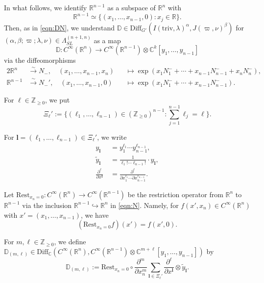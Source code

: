 \documentclass[reqno,11pt]{amsart}
\theoremstyle{remark}
\theoremstyle{definition}
\numberwithin{equation}{section}
\newcommand{\gb}{\beta}
\newcommand{\ga}{\alpha}
\newcommand{\gL}{\Lambda}
\newcommand{\R}{\mathbb{R}}
\newcommand{\C}{\mathbb{C}}
\newcommand{\Z}{\mathbb{Z}}
\newcommand{\To}{\longrightarrow}
\newcommand{\Diff}{\mathrm{Diff}}
\newcommand{\triv}{\mathrm{triv}}
\newcommand{\wy}{\widetilde{y}}
\newcommand{\Rest}{\mathrm{Rest}}
\newcommand{\bD}{\mathbb{D}}
\begin{document}
In what follows, we identify $\R^{n-1}$ as a subspace of $\R^n$ with
\begin{equation}\label{eqn:N}
\R^{n-1}\simeq \{(x_1, \ldots, x_{n-1}, 0) : x_j \in \R\}.
\end{equation}
Then, 
as in \eqref{eqn:DN},
we understand 
$\bD \in \Diff_{G'}(I(\triv, \lambda)^\ga, J(\varpi,\nu)^\gb)$ 
for $(\alpha,\beta; \varpi; \lambda, \nu) \in \gL^{(n+1,n)}_{SL}$
as a map
\begin{equation*}
\bD\colon C^\infty(\R^{n}) \To 
C^{\infty}(\R^{n-1})\otimes \C^k[y_1,\ldots, y_{n-1}]
\end{equation*}
via the diffeomorphisms
\begin{alignat}{2}\label{eqn:coord}
\R^{n} 
&\stackrel{\sim}{\To} N_-, \quad (x_1, \ldots, x_{n-1}, x_n) 
&&\mapsto \exp(x_1 N^-_1 + \cdots +  x_{n-1} N^-_{n-1}+x_nN^-_n),\\
\R^{n-1} 
&\stackrel{\sim}{\To} N_-', \quad (x_1, \ldots, x_{n-1},0) 
&&\mapsto \exp(x_1 N^-_1 + \cdots +  x_{n-1} N^-_{n-1}).\nonumber
\end{alignat}

For $\ell \in \Z_{\geq 0}$, we put
\begin{equation*}
\Xi_\ell':=\{(\ell_1, \ldots, \ell_{n-1}) \in (\Z_{\geq 0})^{n-1} : \sum_{j=1}^{n-1} 
\ell_j= \ell\}.
\end{equation*}

\noindent
For $\textbf{l} = (\ell_1, \ldots, \ell_{n-1})\in \Xi_\ell'$, we write
\begin{align*}
y_{\mathbf{l}}  &= 
y_1^{\ell_1}\cdots y_{n-1}^{\ell_{n-1}},\\[3pt]
\wy_{\mathbf{l}} &= \frac{1}{\ell_1! \cdots \ell_{n-1}!} 
\cdot
y_{\mathbf{l}},\\[3pt]
\frac{\partial^\ell}{\partial x^{\mathbf{l}}} \
&= \frac{\partial^\ell}{\partial x_1^{\ell_1} \cdots \partial x_{n-1}^{\ell_{n-1}}}.
\end{align*}

Let 
$\Rest_{x_n=0} \colon C^\infty(\R^n) \to C^\infty(\R^{n-1})$ be the restriction operator
from $\R^n$ to $\R^{n-1}$ via the inclusion $\R^{n-1} \hookrightarrow \R^n$ in
\eqref{eqn:N}. Namely, for $f(x',x_n) \in C^\infty(\R^n)$ with 
$x' = (x_1, \ldots, x_{n-1})$, we have
\begin{equation*}
(\Rest_{x_n=0}f)(x') = f(x',0).
\end{equation*}


\noindent
For $m, \ell \in \Z_{\geq 0}$,
we define 
$\bD_{(m,\ell)} \in \Diff_\C(C^\infty(\R^{n}), C^\infty(\R^{n-1})\otimes 
\C^{m+\ell}[y_1, \ldots, y_{n-1}])$ by
\begin{equation}\label{eqn:DSBO}
\bD_{(m,\ell)} :=
\Rest_{x_n=0} \circ
\frac{\partial^m}{\partial x_n^m}\sum_{\mathbf{l} \in \Xi_\ell'} \frac{\partial^\ell}{\partial x^{\mathbf{l}}}
\otimes 
\wy_{\mathbf{l}}.
\end{equation}
\end{document}

